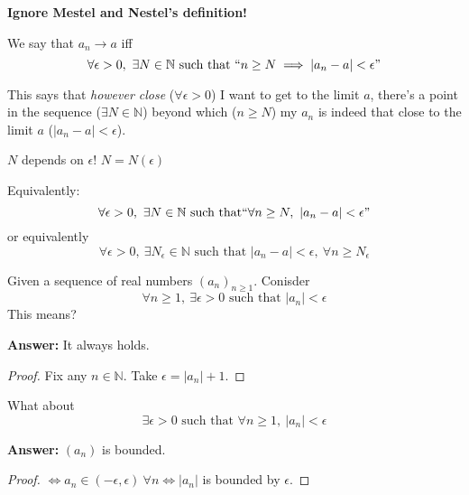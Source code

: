 \textbf{Ignore Mestel and Nestel's definition!}\\

\begin{definition}[Convergence]
We say that $a_n \to a$ iff 
\[\forall \epsilon >0,~\exists N \in \mathbb{N} \text{ such that } ``n \geq N \implies |a_n - a| < \epsilon"\]	
\end{definition}

This says that \emph{however close} ($\forall \epsilon>0$) I want to get to the limit $a$, there's a point in the sequence ($\exists N \in \mathbb{N}$) beyond which ($n \geq N$) my $a_n$ is indeed that close to the limit $a$ ($|a_n - a| <\epsilon$).\\ 

\begin{remark}
$N$ depends on $\epsilon$! $N = N(\epsilon)$	
\end{remark}

Equivalently:
\[\forall \epsilon >0,~ \exists N \in \mathbb{N} \text{ such that} ``\forall n \geq N,~|a_n -a|<\epsilon"\]
or equivalently
\[\forall \epsilon >0,~\exists N_\epsilon\in\mathbb{N} \text{ such that } |a_n - a| < \epsilon,~\forall n \geq N_\epsilon\]

\begin{clicker}Given a sequence of real numbers $(a_n)_{n\geq 1}$. Conisder 
\[\boxed{\forall n \geq 1,~\exists \epsilon >0 \text{ such that } |a_n|< \epsilon}\]
This means? 

\textbf{Answer:} It always holds. \begin{proof}
 Fix any $n \in \mathbb{N}$. Take $\epsilon = |a_n| + 1$. 	
 \end{proof}
 
What about
 \[\boxed{\exists \epsilon >0 \text{ such that } \forall n \geq 1,~|a_n| < \epsilon} \]
 
 \textbf{Answer:} $(a_n)$ is bounded.
 
 
\begin{center}
\end{center}


  \begin{proof}
$\iff a_n \in (-\epsilon,\epsilon)~ \forall n \iff |a_n|$ is bounded by $\epsilon$. \end{proof}

\end{clicker}~

